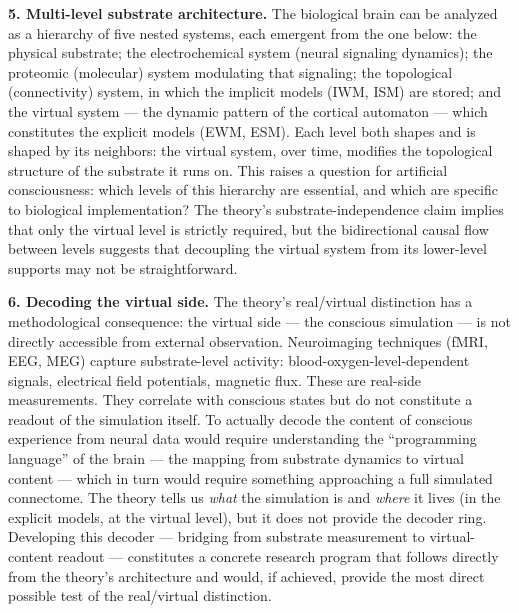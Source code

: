 \documentclass[12pt]{article}
\begin{document}
\textbf{5. Multi-level substrate architecture.} The biological brain can be analyzed as a hierarchy of five nested systems, each emergent from the one below: the physical substrate; the electrochemical system (neural signaling dynamics); the proteomic (molecular) system modulating that signaling; the topological (connectivity) system, in which the implicit models (IWM, ISM) are stored; and the virtual system --- the dynamic pattern of the cortical automaton --- which constitutes the explicit models (EWM, ESM). Each level both shapes and is shaped by its neighbors: the virtual system, over time, modifies the topological structure of the substrate it runs on. This raises a question for artificial consciousness: which levels of this hierarchy are essential, and which are specific to biological implementation? The theory's substrate-independence claim implies that only the virtual level is strictly required, but the bidirectional causal flow between levels suggests that decoupling the virtual system from its lower-level supports may not be straightforward.

\textbf{6. Decoding the virtual side.} The theory's real/virtual distinction has a methodological consequence: the virtual side --- the conscious simulation --- is not directly accessible from external observation. Neuroimaging techniques (fMRI, EEG, MEG) capture substrate-level activity: blood-oxygen-level-dependent signals, electrical field potentials, magnetic flux. These are real-side measurements. They correlate with conscious states but do not constitute a readout of the simulation itself. To actually decode the content of conscious experience from neural data would require understanding the ``programming language'' of the brain --- the mapping from substrate dynamics to virtual content --- which in turn would require something approaching a full simulated connectome. The theory tells us \emph{what} the simulation is and \emph{where} it lives (in the explicit models, at the virtual level), but it does not provide the decoder ring. Developing this decoder --- bridging from substrate measurement to virtual-content readout --- constitutes a concrete research program that follows directly from the theory's architecture and would, if achieved, provide the most direct possible test of the real/virtual distinction.
\end{document}
